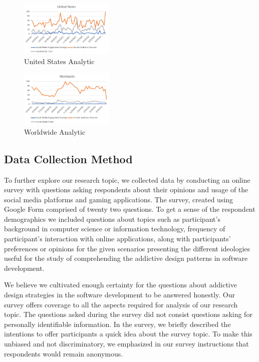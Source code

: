 \documentclass[conference]{IEEEtran}
\begin{document}
\begin{figure}[htbp]
\centerline{\includegraphics[width=0.4\textwidth]{US Graph.PNG}}
\caption{United States Analytic}
\label{fig}
\end{figure}

\begin{figure}[htbp]
\centerline{\includegraphics[width=0.4\textwidth]{Worldwide Analysis Graph.PNG}}
\caption{Worldwide Analytic}
\label{fig}
\end{figure}

\subsection{Data Collection Method}

To further explore our research topic, we collected data by conducting an online survey with questions asking respondents about their opinions and usage of the social media platforms and gaming applications. The survey, created using Google Form comprised of twenty two questions. To get a sense of the respondent demographics we included questions about topics such as participant's background in computer science or information technology, frequency of participant's interaction with online applications, along with participants' preferences or opinions for the given scenarios presenting the different ideologies useful for the study of comprehending the addictive design patterns in software development.

We believe we cultivated enough certainty for the questions about addictive design strategies in the software development to be answered honestly. Our survey offers coverage to all the aspects required for analysis of our research topic. The questions asked during the survey did not consist questions asking for personally identifiable information. In the survey, we briefly described the intentions to offer participants a quick idea about the survey topic. To make this unbiased and not discriminatory, we emphasized in our survey instructions that respondents would remain anonymous.
\end{document}
